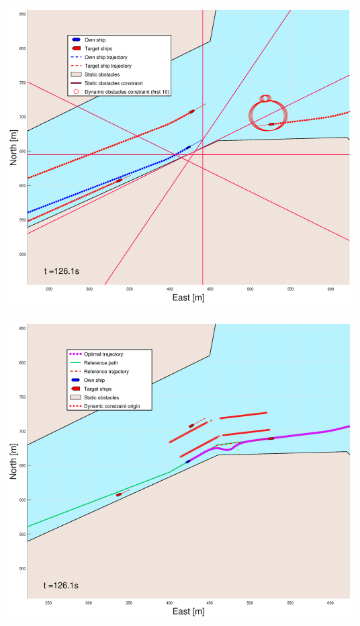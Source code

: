 \begin{figure}[!b]
\begin{subfigure}[b]{0.499\textwidth}
    \end{subfigure}
    \hfill
    \\
    \begin{subfigure}[b]{0.49\textwidth}
        \centering
        \includegraphics[width=\textwidth]{Images/Figures/Trheimfjord/_Simple_0fig1_time=126}
    \end{subfigure}
    \hfill
    \begin{subfigure}[b]{0.499\textwidth}
        \centering
        \includegraphics[width=\textwidth]{Images/Figures/Trheimfjord/_Simple_0fig999_time=126}

\end{subfigure}
\end{figure}
